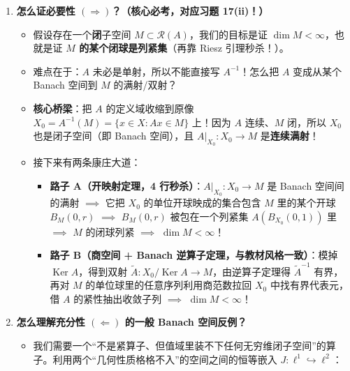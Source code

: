 \documentclass[11pt,a4paper]{article}
\providecommand{\tightlist}{\setlength{\itemsep}{1.8pt}\setlength{\parskip}{0pt}}
\newcommand{\SubPillAmber}[1]{%
  \Needspace{4.5\baselineskip}\vspace{5.5pt}\noindent
  \tcbox[on line, colback=AmberSoft, colframe=AmberMain!45!BorderColor, boxrule=0.45pt,
    arc=3.5pt, left=6pt, right=6pt, top=2pt, bottom=2pt]{\small\bfseries\color{AmberMain}#1}%
  \par\nopagebreak[4]\vspace{3pt}%
}
\begin{document}
\SubPillAmber{【零基础破题思路】}

\begin{enumerate}
\def\labelenumi{\arabic{enumi}.}
\tightlist
\item
  \textbf{怎么证必要性 \((\Rightarrow)\)？（核心必考，对应习题 17(ii)！）}

  \begin{itemize}
  \tightlist
  \item
    假设存在一个\textbf{闭}子空间 \(M \subset \mathcal{R}(A)\)，我们的目标是证 \(\dim M < \infty\)，也就是证 \textbf{\(M\) 的某个闭球是列紧集}（再靠 Riesz 引理秒杀！）。
  \item
    难点在于：\(A\) 未必是单射，所以不能直接写 \(A^{-1}\)！怎么把 \(A\) 变成从某个 Banach 空间到 \(M\) 的满射/双射？
  \item
    \textbf{核心桥梁}：把 \(A\) 的定义域收缩到原像 \(X_0 = A^{-1}(M) = \{x \in X : Ax \in M\}\) 上！因为 \(A\) 连续、\(M\) 闭，所以 \(X_0\) 也是闭子空间（即 Banach 空间），且 \(A|_{X_0}: X_0 \to M\) 是\textbf{连续满射}！
  \item
    接下来有两条康庄大道：

    \begin{itemize}
    \tightlist
    \item
      \textbf{路子 A（开映射定理，4 行秒杀）}：\(A|_{X_0}: X_0 \to M\) 是 Banach 空间间的满射 \(\implies\) 它把 \(X_0\) 的单位开球映成的集合包含 \(M\) 里的某个开球 \(B_M(0, r)\) \(\implies\) \(B_M(0, r)\) 被包在一个列紧集 \(A(B_{X_0}(0, 1))\) 里 \(\implies\) \(M\) 的闭球列紧 \(\implies\) \(\dim M < \infty\)！
    \item
      \textbf{路子 B（商空间 + Banach 逆算子定理，与教材风格一致）}：模掉 \(\operatorname{Ker} A\)，得到双射 \(\tilde{A}: X_0 / \operatorname{Ker} A \to M\)，由逆算子定理得 \(\tilde{A}^{-1}\) 有界，再对 \(M\) 的单位球里的任意序列利用商范数拉回 \(X_0\) 中找有界代表元，借 \(A\) 的紧性抽出收敛子列 \(\implies\) \(\dim M < \infty\)！
    \end{itemize}
  \end{itemize}
\item
  \textbf{怎么理解充分性 \((\Leftarrow)\) 的一般 Banach 空间反例？}

  \begin{itemize}
  \tightlist
  \item
    我们需要一个``不是紧算子、但值域里装不下任何无穷维闭子空间''的算子。利用两个``几何性质格格不入''的空间之间的恒等嵌入 \(J: \ell^1 \hookrightarrow \ell^2\)：


\end{itemize}
\end{enumerate}
\end{document}
